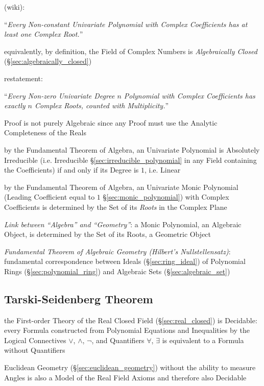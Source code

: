 (wiki):

``\emph{Every Non-constant Univariate Polynomial with Complex Coefficients
has at least one Complex Root.}''

equivalently, by definition, the Field of Complex Numbers is
\emph{Algebraically Closed} (\S\ref{sec:algebraically_closed})

restatement:

``\emph{Every Non-zero Univariate Degree $n$ Polynomial with Complex
Coefficients has exactly $n$ Complex Roots, counted with Multiplicity.}''

Proof is not purely Algebraic since any Proof must use the Analytic Completeness
of the Reals

by the Fundamental Theorem of Algebra, an Univariate Polynomial is Absolutely
Irreducible (i.e. Irreducible \S\ref{sec:irreducible_polynomial} in any Field
containing the Coefficients) if and only if its Degree is $1$, i.e. Linear

by the Fundamental Theorem of Algebra, an Univariate Monic Polynomial
(Leading Coefficient equal to $1$ \S\ref{sec:monic_polynomial}) with Complex
Coefficients is determined by the Set of its \emph{Roots} in the Complex Plane

\emph{Link between ``Algebra'' and ``Geometry''}: a Monic Polynomial, an
Algebraic Object, is determined by the Set of its Roots, a Geometric Object

\emph{Fundamental Theorem of Algebraic Geometry (Hilbert's Nullstellensatz)}:
fundamental correspondence between Ideals (\S\ref{sec:ring_ideal}) of Polynomial
Rings (\S\ref{sec:polynomial_ring}) and Algebraic Sets
(\S\ref{sec:algebraic_set})



\subsection{Tarski-Seidenberg Theorem}\label{sec:tarski_seidenberg}

the First-order Theory of the Real Closed Field (\S\ref{sec:real_closed}) is
Decidable: every Formula constructed from Polynomial Equations and Inequalities
by the Logical Connectives $\vee$, $\wedge$, $\neg$, and Quantifiers $\forall$,
$\exists$ is equivalent to a Formula without Quantifiers

Euclidean Geometry (\S\ref{sec:euclidean_geometry}) without the ability to
measure Angles is also a Model of the Real Field Axioms and therefore also
Decidable


